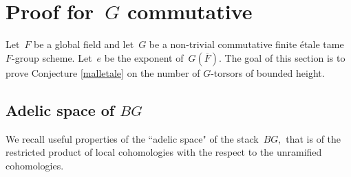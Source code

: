 \documentclass[a4paper,english,12pt]{amsart}
\newcommand{\oF}{\overline F}
\newcommand{\Akk}{\mathfrak A_4}
\DeclareMathOperator{\Autt}{\underline{Aut}}
\numberwithin{equation}{subsection}
\begin{document}
%
\section{Proof for~$G$ commutative}\label{sectioncommutativecase}
Let~$F$ be a global field and let~$G$ be a non-trivial commutative finite \' etale tame $F$-group scheme. Let~$e$ be the exponent of~$G(\oF)$. The goal of this section is to prove Conjecture \ref{malletale} on the number of $G$-torsors of bounded height.
\subsection{Adelic space of $BG$}
We recall useful properties of the ``adelic space" of the stack~$BG,$ that is of the restricted product of local cohomologies with the respect to the unramified cohomologies. 
\end{document}
